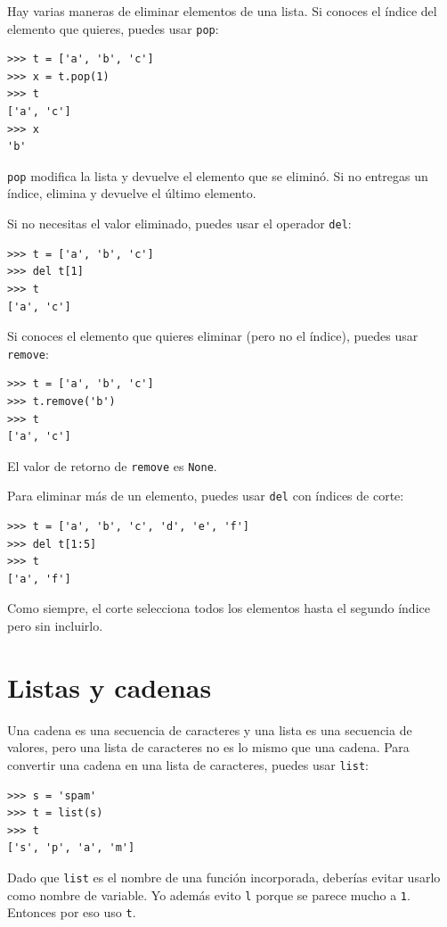 \documentclass[10pt]{book}
\begin{document}
Hay varias maneras de eliminar elementos de una lista.  Si conoces
el índice del elemento que quieres, puedes usar
{\tt pop}:

\begin{verbatim}
>>> t = ['a', 'b', 'c']
>>> x = t.pop(1)
>>> t
['a', 'c']
>>> x
'b'
\end{verbatim}
%
{\tt pop} modifica la lista y devuelve el elemento que se eliminó.
Si no entregas un índice, elimina y devuelve el
último elemento.

Si no necesitas el valor eliminado, puedes usar el
operador {\tt del}:

\begin{verbatim}
>>> t = ['a', 'b', 'c']
>>> del t[1]
>>> t
['a', 'c']
\end{verbatim}
%
Si conoces el elemento que quieres eliminar (pero no el índice),
puedes usar {\tt remove}:

\begin{verbatim}
>>> t = ['a', 'b', 'c']
>>> t.remove('b')
>>> t
['a', 'c']
\end{verbatim}
%
El valor de retorno de {\tt remove} es {\tt None}.

Para eliminar más de un elemento, puedes usar {\tt del} con
índices de corte:

\begin{verbatim}
>>> t = ['a', 'b', 'c', 'd', 'e', 'f']
>>> del t[1:5]
>>> t
['a', 'f']
\end{verbatim}
%
Como siempre, el corte selecciona todos los elementos hasta el segundo índice
pero sin incluirlo.



\section{Listas y cadenas}

Una cadena es una secuencia de caracteres y una lista es una secuencia
de valores, pero una lista de caracteres no es lo mismo que una
cadena.  Para convertir una cadena en una lista de caracteres,
puedes usar {\tt list}:

\begin{verbatim}
>>> s = 'spam'
>>> t = list(s)
>>> t
['s', 'p', 'a', 'm']
\end{verbatim}
%
Dado que {\tt list} es el nombre de una función incorporada, deberías
evitar usarlo como nombre de variable.  Yo además evito {\tt l} porque
se parece mucho a {\tt 1}.  Entonces por eso uso {\tt t}.
\end{document}

